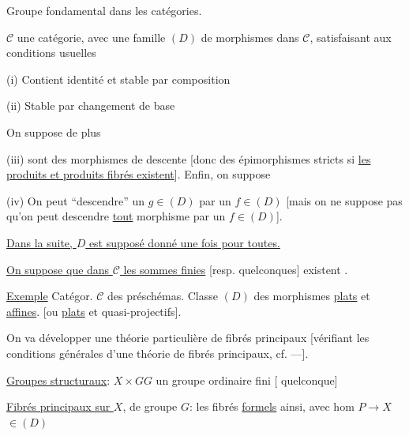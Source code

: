 Groupe fondamental dans les catégories.

$\mathcal C$ une catégorie, avec une famille $(D)$ de morphismes dans $\mathcal C$, satisfaisant aux conditions usuelles

(i) Contient identité et stable par composition

(ii) Stable par changement de base

On suppose de plus

(iii)   sont des morphismes de descente [donc des épimorphismes  stricts si  \uline{les produits et produits fibrés existent}].
Enfin, on suppose



(iv) On peut ``descendre'' un $g\in(D)$ par un $f\in(D)$
[mais on ne suppose pas qu'on peut descendre \uline{tout} morphisme par un $f\in(D)$].

\uline{Dans la suite, $D$ est supposé donné une fois pour toutes.}

\uline{On suppose que dans $\mathcal C$ les sommes finies} [resp. quelconques] existent
.


\uline{Exemple}
Catégor. $\mathcal C$ des préschémas. 
Classe $(D)$ des morphismes \uline{plats} et \uline{affines}.
[ou \uline{plats} et quasi-projectifs].

On va développer une théorie particulière de fibrés principaux [vérifiant les conditions générales  d'une théorie de fibrés principaux, cf. ---].

\uline{Groupes structuraux}: $X\times G$\qquad $G$ un groupe ordinaire fini [ quelconque]

\uline{Fibrés principaux  sur $X$}, de groupe $G$: les fibrés \uline{formels} ainsi, avec hom $P\to X$ $\in(D)$
